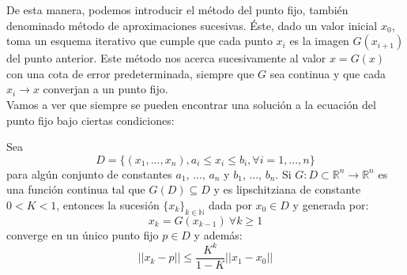 	


De esta manera, podemos introducir el método del punto fijo, también denominado método de aproximaciones sucesivas. Éste, dado un valor inicial $x_0$, toma un esquema iterativo que cumple que cada punto $x_i$ es la imagen $G(x_{i+1})$ del punto anterior. Este método nos acerca sucesivamente al valor $x = G(x)$ con una cota de error predeterminada, siempre que $G$ sea continua y que cada $x_i \longrightarrow x$ converjan a un punto fijo. \\





 Vamos a ver que siempre se pueden encontrar una solución a la ecuación del punto fijo bajo ciertas condiciones:

\begin{theorem}
	Sea $$D = \{(x_1,...,x_n) , a_i \leq x_i \leq b_i, \forall i = 1 ,..., n\}$$ para algún conjunto de constantes $a_1$, ..., $a_n$ y $b_1$, ..., $b_n$. Si $G : D \subset \mathbb{R}^n \longrightarrow \mathbb{R}^n$ es una función continua tal que $G(D) \subseteq D$ y es lipschitziana de constante $0<K<1$, entonces la sucesión $\{x_{k}\}_{k \in \mathbb{N}}$ dada por $x_{0} \in D$ y generada por:
	\[x_{k} = G(x_{k-1} )\ \forall k \geq 1\]
	converge en un único punto fijo $p \in D$ y además:
	\[||x_{k} - p|| \leq \frac{K^k}{1-K}||x_{1} - x_{0}|| \]
\end{theorem}

